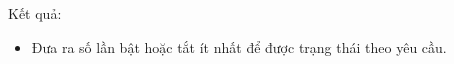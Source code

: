 Kết quả:
\begin{itemize}
	\item     Đưa ra số lần bật hoặc tắt ít nhất để được trạng thái theo yêu cầu.   
\end{itemize}